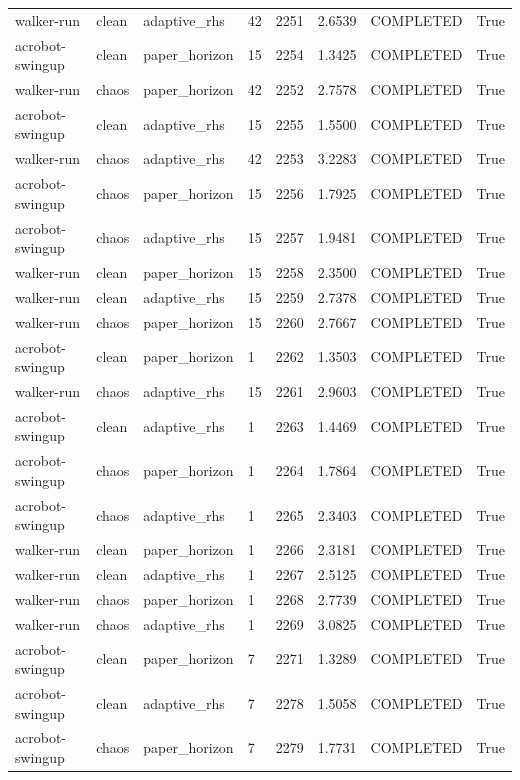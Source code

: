 \begin{tabular}{llllllll}
walker-run & clean & adaptive\_rhs & 42 & 2251 & 2.6539 & COMPLETED & True \\
acrobot-swingup & clean & paper\_horizon & 15 & 2254 & 1.3425 & COMPLETED & True \\
walker-run & chaos & paper\_horizon & 42 & 2252 & 2.7578 & COMPLETED & True \\
acrobot-swingup & clean & adaptive\_rhs & 15 & 2255 & 1.5500 & COMPLETED & True \\
walker-run & chaos & adaptive\_rhs & 42 & 2253 & 3.2283 & COMPLETED & True \\
acrobot-swingup & chaos & paper\_horizon & 15 & 2256 & 1.7925 & COMPLETED & True \\
acrobot-swingup & chaos & adaptive\_rhs & 15 & 2257 & 1.9481 & COMPLETED & True \\
walker-run & clean & paper\_horizon & 15 & 2258 & 2.3500 & COMPLETED & True \\
walker-run & clean & adaptive\_rhs & 15 & 2259 & 2.7378 & COMPLETED & True \\
walker-run & chaos & paper\_horizon & 15 & 2260 & 2.7667 & COMPLETED & True \\
acrobot-swingup & clean & paper\_horizon & 1 & 2262 & 1.3503 & COMPLETED & True \\
walker-run & chaos & adaptive\_rhs & 15 & 2261 & 2.9603 & COMPLETED & True \\
acrobot-swingup & clean & adaptive\_rhs & 1 & 2263 & 1.4469 & COMPLETED & True \\
acrobot-swingup & chaos & paper\_horizon & 1 & 2264 & 1.7864 & COMPLETED & True \\
acrobot-swingup & chaos & adaptive\_rhs & 1 & 2265 & 2.3403 & COMPLETED & True \\
walker-run & clean & paper\_horizon & 1 & 2266 & 2.3181 & COMPLETED & True \\
walker-run & clean & adaptive\_rhs & 1 & 2267 & 2.5125 & COMPLETED & True \\
walker-run & chaos & paper\_horizon & 1 & 2268 & 2.7739 & COMPLETED & True \\
walker-run & chaos & adaptive\_rhs & 1 & 2269 & 3.0825 & COMPLETED & True \\
acrobot-swingup & clean & paper\_horizon & 7 & 2271 & 1.3289 & COMPLETED & True \\
acrobot-swingup & clean & adaptive\_rhs & 7 & 2278 & 1.5058 & COMPLETED & True \\
acrobot-swingup & chaos & paper\_horizon & 7 & 2279 & 1.7731 & COMPLETED & True \\

\end{tabular}
